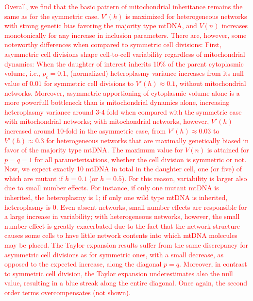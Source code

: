 \documentclass{article}
\begin{document}
\textcolor{red}{Overall, we find that the basic pattern of mitochondrial inheritance remains the same as for the symmetric case. $V'(h)$ is maximized for heterogeneous networks with strong genetic bias favoring the majority type mtDNA, and $V(n)$ increases monotonically for any increase in inclusion parameters. There are, however, some noteworthy differences when compared to symmetric cell divisions: First, asymmetric cell divisions shape cell-to-cell variability regardless of mitochondrial dynamics: When the daughter of interest inherits 10\% of the parent cytoplasmic volume, i.e., $p_c=0.1$, (normalized) heteroplasmy variance increases from its null value of $0.01$ for symmetric cell divisions to $V'(h)\approx0.1$, without mitochondrial networks. Moreover, asymmetric apportioning of cytoplasmic volume alone is a more powerfull bottleneck than is mitochondrial dynamics alone, increasing heteroplasmy variance around 3-4 fold when compared with the symmetric case with mitochondrial networks; with mitochondrial networks, however, $V'(h)$ increased around 10-fold in the asymmetric case, from $V'(h)\approx0.03$ to $V'(h)\approx0.3$ for heterogeneous networks that are maximally genetically biased in favor of the majority type mtDNA. The maximum value for $V(n)$ is attained for $p=q=1$ for all parameterisations, whether the cell division is symmetric or not. 
Now, we expect exactly 10 mtDNA in total in the daughter cell, one (or five) of which are mutant if $h=0.1$ (or $h=0.5$). For this reason, variability is larger also due to small number effects. For instance, if only one mutant mtDNA is inherited, the heteroplasmy is 1; if only one wild type mtDNA is inherited, heteroplasmy is 0. Even absent networks, small number effects are responsible for a large increase in variability; with heterogeneous networks, however, the small number effect is greatly exacerbated due to the fact that the network structure causes some cells to have little network contents into which mtDNA molecules may be placed.
The Taylor expansion results suffer from the same discrepancy for asymmetric cell divisions as for symmetric ones, with a small decrease, as opposed to the expected increase, along the diagonal $p=q$. Moreover, in contrast to symmetric cell division, the Taylor expansion underestimates also the null value, resulting in a blue streak along the entire diagonal. Once again, the second order terms overcompensates (not shown).}
\end{document}
